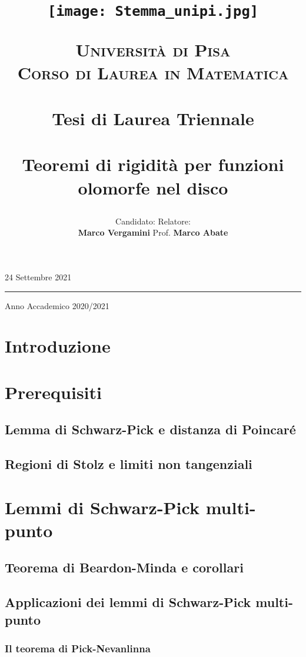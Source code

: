 \documentclass{article}
\title{\begin{figure}[t!]
  \centering
  \texttt{[image: Stemma\_unipi.jpg]}
\end{figure}
\vspace{-17.5mm}
\textsc{\Large Università di Pisa}\\
\textsc{\large Corso di Laurea in Matematica}\\
\, \\
{\large Tesi di Laurea Triennale}\\
\, \\
Teoremi di rigidità per funzioni olomorfe nel disco}
\author{Candidato:  \hspace{200px} Relatore:\\
\textbf{Marco Vergamini} \hfill Prof. \textbf{Marco Abate}}
\date{}
\begin{document}
\maketitle
\vspace*{\fill}
\begin{center}
  24 Settembre 2021
  \par\noindent\rule{\textwidth}{0.5pt}
  \Large Anno Accademico 2020/2021
\end{center}
\newpage
\tableofcontents
\newpage


\section*{Introduzione}


\newpage

\section{Prerequisiti}

\subsection{Lemma di Schwarz-Pick e distanza di Poincaré}


\subsection{Regioni di Stolz e limiti non tangenziali}


\newpage

\section{Lemmi di Schwarz-Pick multi-punto}

\subsection{Teorema di Beardon-Minda e corollari}


\subsection{Applicazioni dei lemmi di Schwarz-Pick multi-punto}


\subsubsection{Il teorema di Pick-Nevanlinna}

\end{document}
